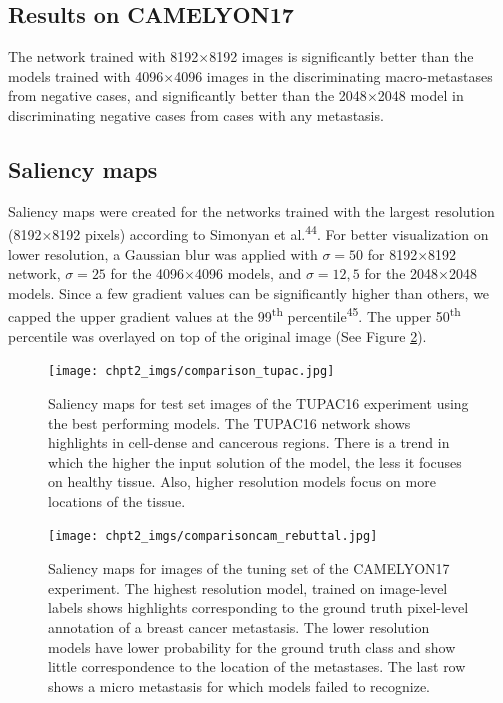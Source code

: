 \documentclass[
  12pt,
  a5,margin=2cmpaper,
]{article}
\begin{document}
\hypertarget{results-on-camelyon17}{%
\subsection{Results on CAMELYON17}\label{results-on-camelyon17}}

The network trained with 8192\(\times\)8192 images is significantly
better than the models trained with 4096\(\times\)4096 images in the
discriminating macro-metastases from negative cases, and significantly
better than the 2048\(\times\)2048 model in discriminating negative
cases from cases with any metastasis.

\hypertarget{saliency-maps}{%
\subsection{Saliency maps}\label{saliency-maps}}

Saliency maps were created for the networks trained with the largest
resolution (8192\(\times\)8192 pixels) according to Simonyan et
al.\textsuperscript{44}. For better visualization on lower resolution, a
Gaussian blur was applied with \(\sigma = 50\) for 8192\(\times\)8192
network, \(\sigma = 25\) for the 4096\(\times\)4096 models, and
\(\sigma = 12,5\) for the 2048\(\times\)2048 models. Since a few
gradient values can be significantly higher than others, we capped the
upper gradient values at the 99\textsuperscript{th}
percentile\textsuperscript{45}. The upper 50\textsuperscript{th}
percentile was overlayed on top of the original image (See Figure
\protect\hyperlink{figure:saliency}{2}).

\begin{figure}
\hypertarget{figure:saliency}{%
\centering
\texttt{[image: chpt2\_imgs/comparison\_tupac.jpg]}
\caption{Saliency maps for test set images of the TUPAC16 experiment
using the best performing models. The TUPAC16 network shows highlights
in cell-dense and cancerous regions. There is a trend in which the
higher the input solution of the model, the less it focuses on healthy
tissue. Also, higher resolution models focus on more locations of the
tissue.}\label{figure:saliency}
}
\end{figure}

\begin{figure}
\hypertarget{figure:saliency}{%
\centering
\texttt{[image: chpt2\_imgs/comparisoncam\_rebuttal.jpg]}
\caption{Saliency maps for images of the tuning set of the CAMELYON17
experiment. The highest resolution model, trained on image-level labels
shows highlights corresponding to the ground truth pixel-level
annotation of a breast cancer metastasis. The lower resolution models
have lower probability for the ground truth class and show little
correspondence to the location of the metastases. The last row shows a
micro metastasis for which models failed to
recognize.}\label{figure:saliency}
}
\end{figure}
\end{document}
